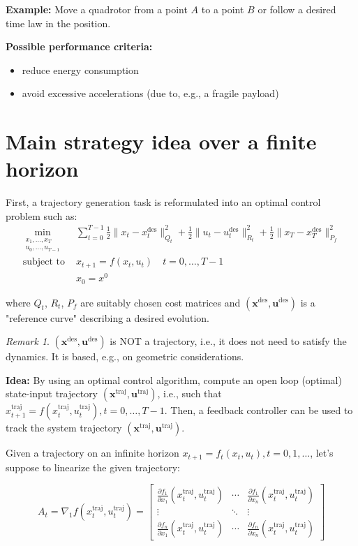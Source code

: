 \documentclass[openany]{book}
\theoremstyle{definition}
\theoremstyle{remark}
\newtheorem*{remark}{Remark}
\begin{document}
\noindent\textbf{Example:}
Move a quadrotor from a point $A$ to a point $B$ or follow a desired time law in the position.

\noindent\textbf{Possible performance criteria:}
\begin{itemize}
    \item reduce energy consumption
    \item avoid excessive accelerations (due to, e.g., a fragile payload)
\end{itemize}

\section{Main strategy idea over a finite horizon}
First, a trajectory generation task is reformulated into an optimal control problem such as:
\begin{align*}
    \min_{\substack{x_1,\dots,x_T\\u_0,\dots,u_{T-1}}} & \sum_{t=0}^{T-1} \frac{1}{2}\|x_t-x_t^{\text{des}}\|_{Q_t}^2 + \frac{1}{2}\|u_t-u_t^{\text{des}}\|_{R_t}^2 + \frac{1}{2}\|x_T-x_T^{\text{des}}\|_{P_f}^2\\
    \text{subject to } & x_{t+1} = f(x_t,u_t) \quad t=0,\dots,T-1\\
    & x_0 = x^0
\end{align*}

where $Q_t$, $R_t$, $P_f$ are suitably chosen cost matrices and $(\mathbf{x}^{\text{des}},\mathbf{u}^{\text{des}})$ is a "reference curve" describing a desired evolution.

\begin{remark}
$(\mathbf{x}^{\text{des}},\mathbf{u}^{\text{des}})$ is NOT a trajectory, i.e., it does not need to satisfy the dynamics. It is based, e.g., on geometric considerations.
\end{remark}

\noindent\textbf{Idea:} By using an optimal control algorithm, compute an open loop (optimal) state-input trajectory $(\mathbf{x}^{\text{traj}},\mathbf{u}^{\text{traj}})$, i.e., such that $x_{t+1}^{\text{traj}} = f(x_t^{\text{traj}},u_t^{\text{traj}}), t=0,\dots,T-1$.
Then, a feedback controller can be used to track the system trajectory $(\mathbf{x}^{\text{traj}},\mathbf{u}^{\text{traj}})$.

Given a trajectory on an infinite horizon $x_{t+1} = f_t(x_t,u_t), t=0,1,\dots$, let's suppose to linearize the given trajectory:

\[
A_t = \nabla_1f(x_t^{\text{traj}},u_t^{\text{traj}}) = \begin{bmatrix}
\frac{\partial f_1}{\partial x_1}(x_t^{\text{traj}},u_t^{\text{traj}}) & \cdots & \frac{\partial f_1}{\partial x_n}(x_t^{\text{traj}},u_t^{\text{traj}})\\
\vdots & \ddots & \vdots\\
\frac{\partial f_n}{\partial x_1}(x_t^{\text{traj}},u_t^{\text{traj}}) & \cdots & \frac{\partial f_n}{\partial x_n}(x_t^{\text{traj}},u_t^{\text{traj}})
\end{bmatrix}
\]
\end{document}
